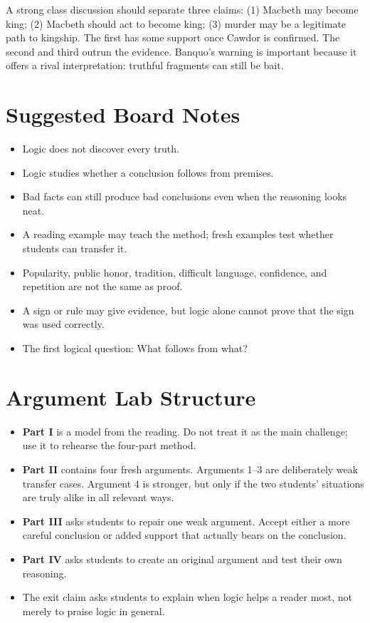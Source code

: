 \documentclass[12pt]{article}
\begin{document}
A strong class discussion should separate three claims: (1) Macbeth may become king; (2) Macbeth should act to become king; (3) murder may be a legitimate path to kingship. The first has some support once Cawdor is confirmed. The second and third outrun the evidence. Banquo's warning is important because it offers a rival interpretation: truthful fragments can still be bait.

\section*{Suggested Board Notes}
\begin{itemize}[leftmargin=*]
\item Logic does not discover every truth.
\item Logic studies whether a conclusion follows from premises.
\item Bad facts can still produce bad conclusions even when the reasoning looks neat.
\item A reading example may teach the method; fresh examples test whether students can transfer it.
\item Popularity, public honor, tradition, difficult language, confidence, and repetition are not the same as proof.
\item A sign or rule may give evidence, but logic alone cannot prove that the sign was used correctly.
\item The first logical question: What follows from what?
\end{itemize}

\section*{Argument Lab Structure}
\begin{itemize}[leftmargin=*]
\item \textbf{Part I} is a model from the reading. Do not treat it as the main challenge; use it to rehearse the four-part method.
\item \textbf{Part II} contains four fresh arguments. Arguments 1--3 are deliberately weak transfer cases. Argument 4 is stronger, but only if the two students' situations are truly alike in all relevant ways.
\item \textbf{Part III} asks students to repair one weak argument. Accept either a more careful conclusion or added support that actually bears on the conclusion.
\item \textbf{Part IV} asks students to create an original argument and test their own reasoning.
\item The exit claim asks students to explain when logic helps a reader most, not merely to praise logic in general.
\end{itemize}
\end{document}
